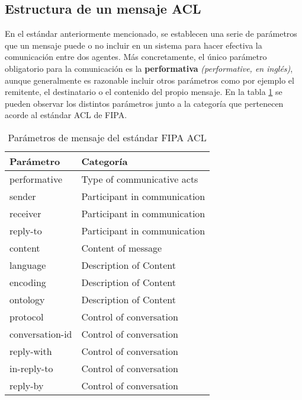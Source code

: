 \subsection{Estructura de un mensaje ACL}
En el estándar anteriormente mencionado, se establecen una serie de parámetros que un mensaje puede o no incluir en un sistema para hacer efectiva la comunicación entre dos agentes. Más concretamente, el único parámetro obligatorio para la comunicación es la \textbf{performativa} \textit{(performative, en inglés)}, aunque generalmente es razonable incluir otros parámetros como por ejemplo el remitente, el destinatario o el contenido del propio mensaje. En la tabla \ref{tab:aclparams} se pueden observar los distintos parámetros junto a la categoría que pertenecen acorde al estándar ACL de FIPA.\\

\begin{table}[]
\centering
\begin{tabular}{|l|l|}
\hline
\textbf{Parámetro} & \textbf{Categoría}           \\ \hline
performative       & Type of communicative acts   \\ \hline
sender             & Participant in communication \\ \hline
receiver           & Participant in communication \\ \hline
reply-to           & Participant in communication \\ \hline
content            & Content of message           \\ \hline
language           & Description of Content       \\ \hline
encoding           & Description of Content       \\ \hline
ontology           & Description of Content       \\ \hline
protocol           & Control of conversation      \\ \hline
conversation-id    & Control of conversation      \\ \hline
reply-with         & Control of conversation      \\ \hline
in-reply-to        & Control of conversation      \\ \hline
reply-by           & Control of conversation      \\ \hline
\end{tabular}
\caption{Parámetros de mensaje del estándar FIPA ACL \cite{unknown-author-2002}}
\label{tab:aclparams}
\end{table}

